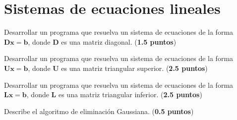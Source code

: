 \documentclass{article}
\theoremstyle{problemstyle}
\begin{document}
\section{Sistemas de ecuaciones lineales}\label{sec:sistemas_de_ecuaciones_lineales} %


\begin{problem}
Desarrollar un programa que resuelva un sistema de ecuaciones de la forma $\mathbf{Dx} = \mathbf{b}$, donde $ \mathbf{D} $ es una matriz diagonal. (\textbf{1.5 puntos})
\end{problem}

\begin{problem}
Desarrollar un programa que resuelva un sistema de ecuaciones de la forma $\mathbf{Ux} = \mathbf{b}$, donde $ \mathbf{U} $ es una matriz triangular superior. (\textbf{2.5 puntos})
\end{problem}

\begin{problem}
Desarrollar un programa que resuelva un sistema de ecuaciones de la forma $\mathbf{Lx} = \mathbf{b}$, donde $ \mathbf{L} $ es una matriz triangular inferior. (\textbf{2.5 puntos})
\end{problem}

\begin{problem}
Describe el algoritmo de eliminaci\'on Gaussiana. (\textbf{0.5 puntos})
\end{problem}
\end{document}
